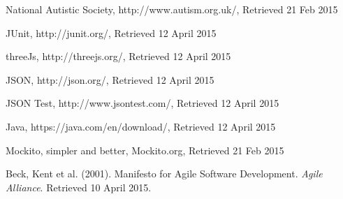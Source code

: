 \documentclass[a4paper, 11pt]{article}
\begin{document}
\begin{thebibliography}{100}
 National Autistic Society, http://www.autism.org.uk/, Retrieved 21 Feb 2015

 JUnit, http://junit.org/, Retrieved 12 April 2015

 threeJs, http://threejs.org/, Retrieved 12 April 2015 

 JSON, http://json.org/, Retrieved 12 April 2015

 JSON Test, http://www.jsontest.com/, Retrieved 12 April 2015

 Java,  https://java.com/en/download/, Retrieved 12 April 2015

 Mockito, simpler and better, Mockito.org, Retrieved 21 Feb 2015

 Beck, Kent et al. (2001). Manifesto for Agile Software Development. \textit{Agile Alliance}. Retrieved 10 April 2015.

\end{thebibliography}
\end{document}
